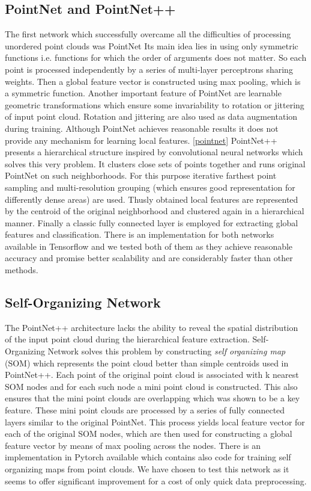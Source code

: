 \subsection{PointNet and PointNet++}
The first network which successfully overcame all the difficulties of processing unordered point clouds was PointNet \cite{qi_pointnet:_2016} Its main idea lies in using only symmetric functions i.e. functions for which the order of arguments does not matter. So each point is processed independently by a series of multi-layer perceptrons sharing weights. Then a global feature vector is constructed using max pooling, which is a symmetric function. Another important feature of PointNet are learnable geometric transformations which ensure some invariability to rotation or jittering of input point cloud. Rotation and jittering are also used as data augmentation during training. Although PointNet achieves reasonable results it does not provide any mechanism for learning local features. \autoref{pointnet}
PointNet++ \cite{qi_pointnet++:_2017} presents a hierarchical structure inspired by convolutional neural networks which solves this very problem. It clusters close sets of points together and runs original PointNet on such neighborhoods. For this purpose iterative farthest point sampling and multi-resolution grouping (which ensures good representation for differently dense areas) are used. Thusly obtained local features are represented by the centroid of the original neighborhood and clustered again in a hierarchical manner. Finally a classic fully connected layer is employed for extracting global features and classification.
There is an implementation for both networks available in Tensorflow and we tested both of them as they achieve reasonable accuracy and promise better scalability and are considerably faster than other methods.



\subsection{Self-Organizing Network}
The PointNet++ architecture lacks the ability to reveal the spatial distribution of the input point cloud during the hierarchical feature extraction. Self-Organizing Network \cite{li_so-net:_2018} solves this problem by constructing \textit{self organizing map} (SOM) which represents the point cloud better than simple centroids used in PointNet++. Each point of the original point cloud is associated with k nearest SOM nodes and for each such node a mini point cloud is constructed. This also ensures that the mini point clouds are overlapping which was shown to be a key feature. These mini point clouds are processed by a series of fully connected layers similar to the original PointNet. This process yields local feature vector for each of the original SOM nodes, which are then used for constructing a global feature vector by means of max pooling across the nodes. There is an implementation in Pytorch available which contains also code for training self organizing maps from point clouds. We have chosen to test this network as it seems to offer significant improvement for a cost of only quick data preprocessing.

